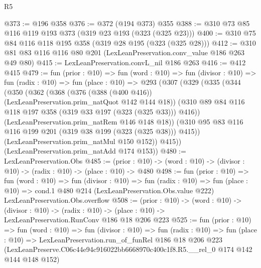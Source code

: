 \begin{lexlean}{R5}
\begin{coremodule}
@373 := @196 @358
@376 := @372 (@194 @373) @355
@388 := @310 @73 @85 @116 @119 @193 @373 (@319 @23 @193 (@323 (@325 @23)))
@400 := @310 @75 @84 @116 @118 @195 @358 (@319 @28 @195 (@323 (@325 @28)))
@412 := @310 @81 @83 @116 @116 @80 @201 (LexLeanPreservation.conv_value @186 @263 @49 @80)
@415 := LexLeanPreservation.convL_nil @186 @263
@416 := @412 @415
@479 := fun (prior : @10) =>
  fun (word : @10) =>
  fun (divisor : @10) =>
  fun (radix : @10) =>
  fun (place : @10) =>
  @293
    (@307
      (@329
        (@335
          (@344
            (@350
              (@362
                (@368
                  (@376 (@388 (@400 @416)) (LexLeanPreservation.prim_natQuot @142 @144 @18))
                  (@310 @89 @84 @116 @118 @197 @358 (@319 @33 @197 (@323 (@325 @33))) @416))
                (LexLeanPreservation.prim_natRem @146 @148 @18))
              (@310 @95 @83 @116 @116 @199 @201 (@319 @38 @199 (@323 (@325 @38))) @415))
            (LexLeanPreservation.prim_natMul @150 @152))
          @415))
      (LexLeanPreservation.prim_natAdd @174 @153))
@480 := LexLeanPreservation.Obs
@485 := (prior : @10) -> (word : @10) -> (divisor : @10) -> (radix : @10) -> (place : @10) -> @480
@498 := fun (prior : @10) =>
  fun (word : @10) =>
  fun (divisor : @10) =>
  fun (radix : @10) =>
  fun (place : @10) =>
  cond.{1} @480 @214 (LexLeanPreservation.Obs.value @222) LexLeanPreservation.Obs.overflow
@508 := (prior : @10) ->
  (word : @10) ->
  (divisor : @10) ->
  (radix : @10) -> (place : @10) -> LexLeanPreservation.RunConv @186 @18 @206 @223
@525 := fun (prior : @10) =>
  fun (word : @10) =>
  fun (divisor : @10) =>
  fun (radix : @10) =>
  fun (place : @10) =>
  LexLeanPreservation.run_of_funRel
    @186
    @18
    @206
    @223
    (LexLeanPreserve.C06c44e94c916022bb6668970c400c1f8.R5.__rel_0 @174 @142 @144 @148 @152)
\end{coremodule}
\end{lexlean}
